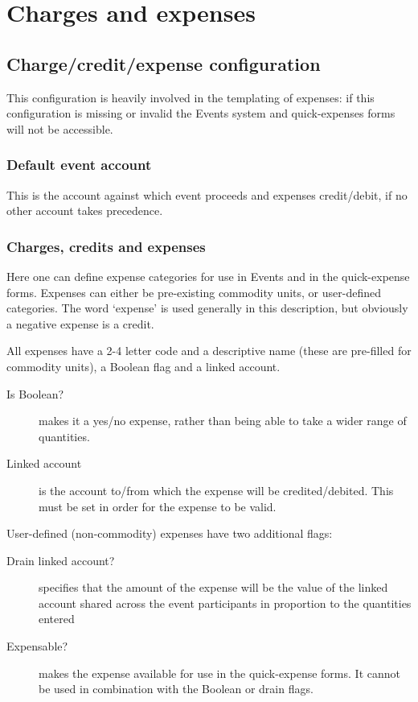 \documentclass{report}
\begin{document}
\section{Charges and expenses}

\subsection{Charge/credit/expense configuration}

This configuration is heavily involved in the templating of expenses: if this configuration is missing or invalid the Events system and quick-expenses forms will not be accessible.

\subsubsection{Default event account}

This is the account against which event proceeds and expenses credit/debit, if no other account takes precedence.

\subsubsection{Charges, credits and expenses}\label{fee_conf}

Here one can define expense categories for use in Events and in the quick-expense forms.  Expenses can either be pre-existing commodity units, or user-defined categories.  The word `expense' is used generally in this description, but obviously a negative expense is a credit.

All expenses have a 2-4 letter code and a descriptive name (these are pre-filled for commodity units), a Boolean flag and a linked account.

\begin{description}
\item[Is Boolean?] makes it a yes/no expense, rather than being able to take a wider range of quantities.
\item[Linked account] is the account to/from which the expense will be credited/debited.  This must be set in order for the expense to be valid.
\end{description}

User-defined (non-commodity) expenses have two additional flags:

\begin{description}
\item[Drain linked account?] specifies that the amount of the expense will be the value of the linked account shared across the event participants in proportion to the quantities entered
\item[Expensable?] makes the expense available for use in the quick-expense forms.  It cannot be used in combination with the Boolean or drain flags.
\end{description}
\end{document}

